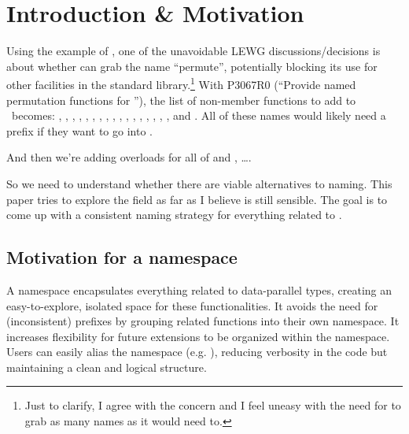 \pagestyle{scrheadings}




\section{Introduction \& Motivation}

Using the example of \std{}, one of the unavoidable
LEWG discussions/decisions is about whether  can grab the name
“permute”, potentially blocking its use for other facilities in the standard
library.\footnote{Just to clarify, I agree with the concern and I feel uneasy
with the need for  to grab as many names as it would need to.}
With P3067R0 (“Provide named permutation functions for \std{}”), the
list of non-member functions to add to \std\ becomes:
, , , , ,
, , , ,
, , , , ,
, , , and .
All of these names would likely need a  prefix if they want to go
into \std.

And then we're adding \simd overloads for all of  and
, \ldots.

So we need to understand whether there are viable alternatives to 
naming.
This paper tries to explore the field as far as I believe is still sensible.
The goal is to come up with a consistent naming strategy for everything related
to .

\subsection{Motivation for a  namespace}
\label{sec:namespacemotivation}

A \std{} namespace encapsulates everything related to data-parallel
types, creating an easy-to-explore, isolated space for these functionalities.
It avoids the need for (inconsistent)  prefixes by grouping related
functions into their own namespace.
It increases flexibility for future extensions to be organized within the
\std{} namespace.
Users can easily alias the namespace (e.g. ),
reducing verbosity in the code but maintaining a clean and logical structure.

